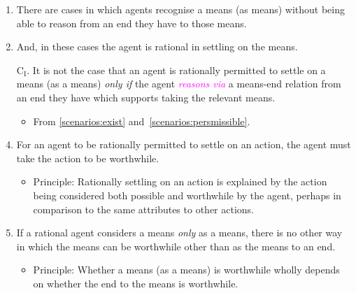 \documentclass[10pt]{article}
\begin{document}
\begin{enumerate}[label=\arabic*., ref=(\arabic*)]

\item\label{scenarios:exist} There are cases in which agents recognise a means (as means) without being able to reason from an end they have to those means.

\item\label{scenarios:persmissible} And, in these cases the agent is rational in settling on the means.

\item[C\(_{\text{I}}\).]\label{scenario:no-reasoning} It is not the case that an agent is rationally permitted to settle on a means (as a means)  \emph{only if} the agent \textcolor{fuchsia}{\emph{reasons via}} a means-end relation from an end they have which supports taking the relevant means.

  \begin{itemize}
  \item From \ref{scenarios:exist} and~\ref{scenarios:persmissible}.
  \end{itemize}

\item\label{settle:worthwhile} For an agent to be rationally permitted to settle on an action, the agent must take the action to be worthwhile.

  \begin{itemize}
  \item Principle: Rationally settling on an action is explained by the action being considered both possible and worthwhile by the agent, perhaps in comparison to the same attributes to other actions.
  \end{itemize}

\item\label{m-e:dependence} If a rational agent considers a means \emph{only} as a means, there is no other way in which the means can be worthwhile other than as the means to an end.

  \begin{itemize}
  \item Principle: Whether a means (as a means) is worthwhile wholly depends on whether the end to the means is worthwhile.
  \end{itemize}


\end{enumerate}
\end{document}
